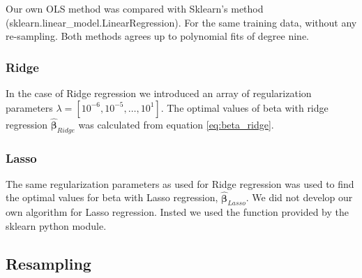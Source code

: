 Our own OLS method was compared with Sklearn's method
(sklearn.linear\_model.LinearRegression). For the same training data, without
any re-sampling. Both methods agrees up to polynomial fits of degree nine.  

\subsubsection{Ridge}
In the case of Ridge regression we introduced an array of regularization
parameters $\lambda = [10^{-6}, 10^{-5}, \hdots, 10^{1}]$. The optimal values
of beta with ridge regression $\hat{\bm{\beta } } _{Ridge} $ was calculated
from equation \eqref{eq:beta_ridge}. 

\subsubsection{Lasso}
The same regularization parameters as used for Ridge regression was used to find the
optimal values for beta with Lasso regression, $\hat{\bm{\beta } } _{Lasso} $. We did not develop our
own algorithm for Lasso regression. Insted we used the function provided by the
sklearn python module.  

\subsection{Resampling}



